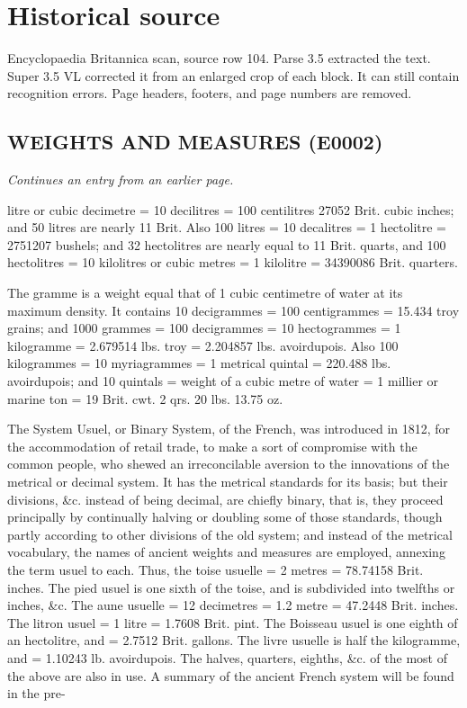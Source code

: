 \documentclass{article}
\begin{document}
\section*{Historical source}
Encyclopaedia Britannica scan, source row 104. Parse 3.5 extracted the text. Super 3.5 VL corrected it from an enlarged crop of each block. It can still contain recognition errors.
Page headers, footers, and page numbers are removed.

\subsection*{WEIGHTS AND MEASURES (E0002)}
\textit{Continues an entry from an earlier page.}

litre or cubic decimetre = 10 decilitres = 100 centilitres
27052 Brit. cubic inches; and 50 litres are nearly 11 Brit.
Also 100 litres = 10 decalitres = 1 hectolitre = 2751207
bushels; and 32 hectolitres are nearly equal to 11 Brit.
quarts, and 100 hectolitres = 10 kilolitres or cubic metres = 1
kilolitre = 34390086 Brit. quarters.

The gramme is a weight equal that of 1 cubic centimetre of water at its maximum density. It contains 10 decigrammes = 100 centigrammes = 15.434 troy grains; and 1000 grammes = 100 decigrammes = 10 hectogrammes = 1 kilogramme = 2.679514 lbs. troy = 2.204857 lbs. avoirdupois. Also 100 kilogrammes = 10 myriagrammes = 1 metrical quintal = 220.488 lbs. avoirdupois; and 10 quintals = weight of a cubic metre of water = 1 millier or marine ton = 19 Brit. cwt. 2 qrs. 20 lbs. 13.75 oz.

The System Usuel, or Binary System, of the French, was introduced in 1812, for the accommodation of retail trade, to make a sort of compromise with the common people, who shewed an irreconcilable aversion to the innovations of the metrical or decimal system. It has the metrical standards for its basis; but their divisions, \&c. instead of being decimal, are chiefly binary, that is, they proceed principally by continually halving or doubling some of those standards, though partly according to other divisions of the old system; and instead of the metrical vocabulary, the names of ancient weights and measures are employed, annexing the term usuel to each. Thus, the toise usuelle = 2 metres = 78.74158 Brit. inches. The pied usuel is one sixth of the toise, and is subdivided into twelfths or inches, \&c. The aune usuelle = 12 decimetres = 1.2 metre = 47.2448 Brit. inches. The litron usuel = 1 litre = 1.7608 Brit. pint. The Boisseau usuel is one eighth of an hectolitre, and = 2.7512 Brit. gallons. The livre usuelle is half the kilogramme, and = 1.10243 lb. avoirdupois. The halves, quarters, eighths, \&c. of the most of the above are also in use. A summary of the ancient French system will be found in the pre-
\end{document}

